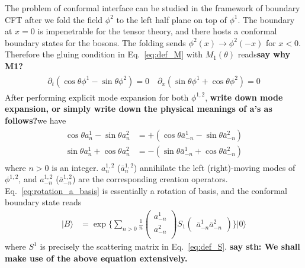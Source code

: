 The problem of conformal interface can be studied in the framework of boundary CFT\cite{cardy_boundary_2004,cardy_conformal_1984} after we fold the field $\phi^2$ to the left half plane on top of $\phi^1$\cite{oshikawa_boundary_2010}. The boundary at $x=0$ is impenetrable for the tensor theory, and there hosts a conformal boundary states for the bosons. The folding sends $\phi^2(x)\rightarrow\phi^2(-x)$ for $x<0$. Therefore the gluing condition in Eq.~\eqref{eq:def_M} with $M_1(\theta)$ reads{\bf\color{red}say why M1?}
\begin{eqnarray}\begin{aligned}
\partial_t(\cos\theta\phi^1-\sin\theta\phi^2)=0 \quad
\partial_x(\sin\theta\phi^1+\cos\theta\phi^2)=0 
\end{aligned}\end{eqnarray}
After performing explicit mode expansion for both $\phi^{1,2}$, {\bf\color{red}write down mode expansion, or simply write down the physical meanings of a's as follows?}we have
\begin{eqnarray}\begin{aligned}
\label{eq:rotation_a_basis}
\cos\theta a_n^1-\sin\theta a_n^2 &= +( \cos\theta\bar{a}_{-n}^1-\sin\theta \bar{a}_{-n}^2 ) \\
\sin\theta a_n^1+\cos\theta a_n^2 &= -( \sin\theta\bar{a}_{-n}^1+\cos\theta \bar{a}_{-n}^2 ) 
\end{aligned}\end{eqnarray}
where $n>0$ is an integer. $a_n^{1,2}$ ($\bar{a}_n^{1,2}$) annihilate the left (right)-moving modes of $\phi^{1,2}$, and $a_{-n}^{1,2}$ ($\bar{a}_{-n}^{1,2}$) are the corresponding creation operators. Eq.~\eqref{eq:rotation_a_basis} is essentially a rotation of basis, and the conformal boundary state reads\cite{oshikawa_boundary_2010}
\begin{equation}
\label{eq:bd_state}
\begin{aligned}
| B \rangle 
& =  \exp\Big\{ \sum_{n > 0 } \frac{1}{n}
\begin{pmatrix}
a_{-n}^1\\
a_{-n}^2\\                              
\end{pmatrix}
S_1
\begin{pmatrix}
\bar{a}_{-n}^1  \bar{a}_{-n}^2
\end{pmatrix} \Big\} |0\rangle
\end{aligned}
\end{equation}
where $S^1$ is precisely the scattering matrix in Eq.~\eqref{eq:def_S}.  {\bf\color{red}say sth: We shall make use of the above equation extensively. }
